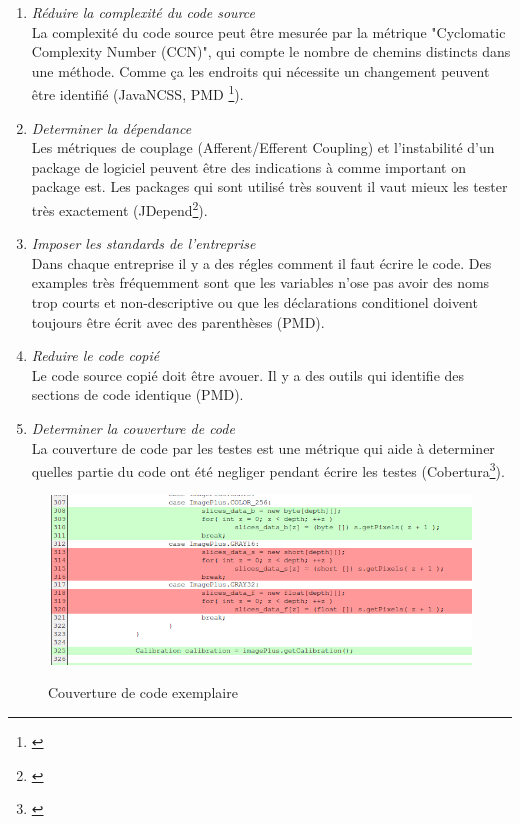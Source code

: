 \begin{enumerate}

\item \textit{Réduire la complexité du code source} \\ La complexité du code source peut être mesurée par la métrique "Cyclomatic Complexity Number (CCN)", qui compte le nombre de chemins distincts dans une méthode. Comme ça les endroits qui nécessite un changement peuvent être identifié (JavaNCSS, PMD \footnote{\citep{pluginpmd}}).

\item \textit{Determiner la dépendance} \\ Les métriques de couplage (Afferent/Efferent Coupling) et l'instabilité d'un package de logiciel peuvent être des indications à comme important on package est. Les packages qui sont utilisé très souvent il vaut mieux les tester très exactement (JDepend\footnote{\citep{pluginjdepend}}).

\item \textit{Imposer les standards de l'entreprise}\\ Dans chaque entreprise il y a des régles comment il faut écrire le code. Des examples très fréquemment sont que les variables n'ose pas avoir des noms trop courts et non-descriptive ou que les déclarations conditionel doivent toujours être écrit avec des parenthèses (PMD).
\item \textit{Reduire le code copié} \\ Le code source copié doit être avouer. Il y a des outils qui identifie des sections de code identique (PMD).

\item \textit{Determiner la couverture de code} \\ La couverture de code par les testes est une métrique qui aide à determiner quelles partie du code ont été negliger pendant écrire les testes (Cobertura\footnote{\citep{plugincobertura}}).

\end{enumerate}

\begin{figure}[H]
\centering
\includegraphics[width=15cm]{bilder/Coverage}
\caption{Couverture de code exemplaire} \cite{codecoverage}
\label{fig:coverage}
\end{figure}


